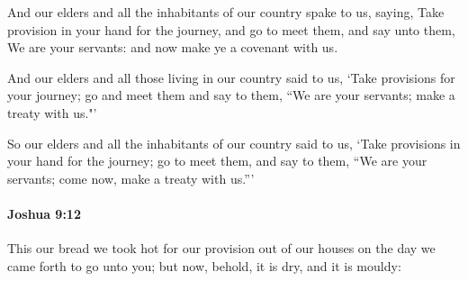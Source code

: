 			\begin{versebox}
					\item[BHS] 
					\item[ASV] And our elders and all the inhabitants of our country spake to us, saying, Take provision in your hand for the journey, and go to meet them, and say unto them, We are your servants: and now make ye a covenant with us.
					\item[NIV] And our elders and all those living in our country said to us, ‘Take provisions for your journey; go and meet them and say to them, “We are your servants; make a treaty with us."’
					\item[NRSV] So our elders and all the inhabitants of our country said to us, ‘Take provisions in your hand for the journey; go to meet them, and say to them, “We are your servants; come now, make a treaty with us.”’
			\end{versebox}

		\paragraph{Joshua 9:12} %
			\label{JOSHUA-9-12}

			This our bread we took hot for our provision out of our houses on the day we came forth to go unto you; but now, behold, it is dry, and it is mouldy:

